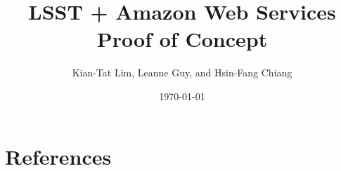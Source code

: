 \documentclass[DM,authoryear,toc]{lsstdoc}
\title{LSST + Amazon Web Services Proof of Concept}
\author{%
Kian-Tat Lim, Leanne Guy, and Hsin-Fang Chiang
}
\date{\today}
\begin{document}

\mkshorttitle




\appendix
\section{References} \label{sec:bib}

\end{document}
